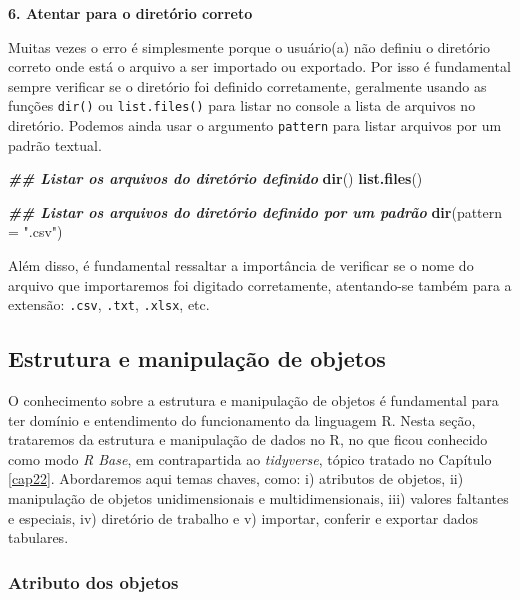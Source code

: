 \documentclass[
]{article}
\newenvironment{Shaded}{\begin{snugshade}}{\end{snugshade}}
\newcommand{\AttributeTok}[1]{\textcolor[rgb]{0.13,0.29,0.53}{#1}}
\newcommand{\DocumentationTok}[1]{\textcolor[rgb]{0.56,0.35,0.01}{\textbf{\textit{#1}}}}
\newcommand{\FunctionTok}[1]{\textcolor[rgb]{0.13,0.29,0.53}{\textbf{#1}}}
\newcommand{\NormalTok}[1]{#1}
\newcommand{\StringTok}[1]{\textcolor[rgb]{0.31,0.60,0.02}{#1}}
\begin{document}
\textbf{6. Atentar para o diretório correto}

Muitas vezes o erro é simplesmente porque o usuário(a) não definiu o diretório correto onde está o arquivo a ser importado ou exportado. Por isso é fundamental sempre verificar se o diretório foi definido corretamente, geralmente usando as funções \texttt{dir()} ou \texttt{list.files()} para listar no console a lista de arquivos no diretório. Podemos ainda usar o argumento \texttt{pattern} para listar arquivos por um padrão textual.

\begin{Shaded}
\begin{Highlighting}[]
\DocumentationTok{\#\# Listar os arquivos do diretório definido}
\FunctionTok{dir}\NormalTok{()}
\FunctionTok{list.files}\NormalTok{()}

\DocumentationTok{\#\# Listar os arquivos do diretório definido por um padrão}
\FunctionTok{dir}\NormalTok{(}\AttributeTok{pattern =} \StringTok{".csv"}\NormalTok{)}
\end{Highlighting}
\end{Shaded}

Além disso, é fundamental ressaltar a importância de verificar se o nome do arquivo que importaremos foi digitado corretamente, atentando-se também para a extensão: \texttt{.csv}, \texttt{.txt}, \texttt{.xlsx}, etc.

\hypertarget{estrutura-e-manipulauxe7uxe3o-de-objetos}{%
\subsection{Estrutura e manipulação de objetos}\label{estrutura-e-manipulauxe7uxe3o-de-objetos}}

O conhecimento sobre a estrutura e manipulação de objetos é fundamental para ter domínio e entendimento do funcionamento da linguagem R. Nesta seção, trataremos da estrutura e manipulação de dados no R, no que ficou conhecido como modo \emph{R Base}, em contrapartida ao \emph{tidyverse}, tópico tratado no Capítulo \ref{cap22}. Abordaremos aqui temas chaves, como: i) atributos de objetos, ii) manipulação de objetos unidimensionais e multidimensionais, iii) valores faltantes e especiais, iv) diretório de trabalho e v) importar, conferir e exportar dados tabulares.

\hypertarget{atributo-dos-objetos}{%
\subsubsection{Atributo dos objetos}\label{atributo-dos-objetos}}
\end{document}
